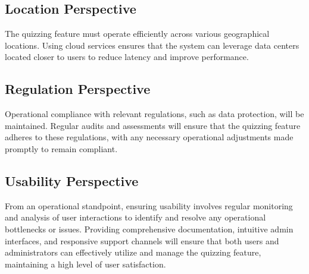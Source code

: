 \subsection{Location Perspective}

The quizzing feature must operate efficiently across various geographical locations. Using cloud services ensures that the system can leverage data centers located closer to users to reduce latency and improve performance.


\subsection{Regulation Perspective}

Operational compliance with relevant regulations, such as data protection, will be maintained. Regular audits and assessments will ensure that the quizzing feature adheres to these regulations, with any necessary operational adjustments made promptly to remain compliant.


\subsection{Usability Perspective}

From an operational standpoint, ensuring usability involves regular monitoring and analysis of user interactions to identify and resolve any operational bottlenecks or issues. Providing comprehensive documentation, intuitive admin interfaces, and responsive support channels will ensure that both users and administrators can effectively utilize and manage the quizzing feature, maintaining a high level of user satisfaction.
